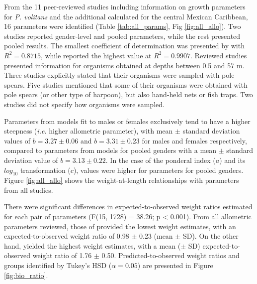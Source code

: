 \documentclass[fleqn,10pt,lineno]{wlpeerj} %
\begin{document}
From the 11 peer-reviewed studies including information on growth
parameters for \emph{P. volitans} and the additional calculated for the
central Mexican Caribbean, 16 parameters were identified (Table
\ref{tab:all_params}, Fig \ref{fig:all_allo}). Two studies
\citep{aguilarperera_2016,fogg_2013} reported gender-level and pooled
parameters, while the rest presented pooled results. The smallest
coefficient of determination was presented by \citet{chin_2016} with
\(R^2 = 0.8715\), while \citet{sabidoitza_2016} reported the highest
value at \(R^2 = 0.9907\). Reviewed studies presented information for
organisms obtained at depths between 0.5 and 57 m. Three studies
\citep{aguilarperera_2016,chin_2016,dahl_2014} explicitly stated that
their organisms were sampled with pole spears. Five studies
\citep{sandel_2015,barbour_2011,fogg_2013,edwards_2014,sabidoitza_2016,toledohernndez_2014}
mentioned that some of their organisms were obtained with pole spears
(or other type of harpoon), but also hand-held nets or fish traps. Two
studies \citep{deleon_2013,darling_2011} did not specify how organisms
were sampled.

Parameters from models fit to males or females exclusively tend to have
a higher steepness (\emph{i.e.} higher allometric parameter), with mean
\(\pm\) standard deviation values of \(b = 3.27 \pm 0.06\) and
\(b = 3.31 \pm 0.23\) for males and females respectively, compared to
parameters from models for pooled genders with a mean \(\pm\) standard
deviation value of \(b = 3.13 \pm 0.22\). In the case of the ponderal
index (\(a\)) and its \(log_{10}\) transformation (\(c\)), values were
higher for parameters for pooled genders. Figure \ref{fig:all_allo}
shows the weight-at-length relationships with parameters from all
studies.

There were significant differences in expected-to-observed weight ratios
estimated for each pair of parameters (F(15, 1728) = 38.26; p
\textless{} 0.001). From all allometric parameters reviewed, those of
\citet{edwards_2014} provided the lowest weight estimates, with an
expected-to-observed weight ratio of 0.98 \(\pm\) 0.23 (mean \(\pm\)
SD). On the other hand,\citet{barbour_2011} yielded the highest weight
estimates, with a mean (\(\pm\) SD) expected-to-observed weight ratio of
1.76 \(\pm\) 0.50. Predicted-to-observed weight ratios and groups
identified by Tukey's HSD (\(\alpha = 0.05\)) are presented in Figure
\ref{fig:bio_ratio}.

\clearpage
\end{document}
